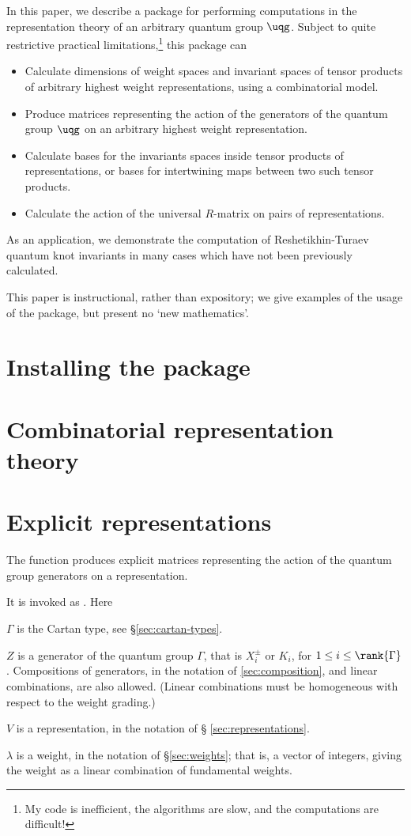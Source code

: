 In this paper, we describe a \MMA package for performing computations in
the representation theory of an arbitrary quantum group $\uqg$. Subject
to quite restrictive practical limitations,\footnote{My code is
inefficient, the algorithms are slow, and the computations are
difficult!} this package can
\begin{itemize}
\item Calculate dimensions of weight spaces and invariant spaces of
tensor products of arbitrary highest weight representations, using a
combinatorial model.
\item Produce matrices representing the action of the generators of the quantum group
$\uqg$ on an arbitrary highest weight representation.
\item Calculate bases for the invariants spaces inside tensor
products of representations, or bases for intertwining maps between
two such tensor products.
\item Calculate the action of the universal $R$-matrix on pairs of
representations.
\end{itemize}
As an application, we demonstrate the computation of
Reshetikhin-Turaev quantum knot invariants in many cases which have
not been previously calculated.

This paper is instructional, rather than expository; we give
examples of the usage of the package, but present no `new
mathematics'.

\section{Installing the  package}

\section{Combinatorial representation theory}

\section{Explicit representations}
The function  produces explicit matrices
representing the action of the quantum group generators on a
representation.

It is invoked as .
Here
\begin{defn}
\item[$\Gamma$] is the Cartan type, see \S \ref{sec:cartan-types}.
\item[$Z$] is a generator of the quantum group $\Gamma$, that is
$X_i^\pm$ or $K_i$, for $1 \leq i \leq \rank{\Gamma}$. Compositions of
generators, in the notation of \ref{sec:composition}, and linear
combinations, are also allowed. (Linear combinations must be homogeneous
with respect to the weight grading.)
\item[$V$] is a representation, in the notation of \S
\ref{sec:representations}.
\item[$\lambda$] is a weight, in the notation of \S \ref{sec:weights};
that is, a vector of integers, giving the weight as a linear combination
of fundamental weights.
\end{defn}

